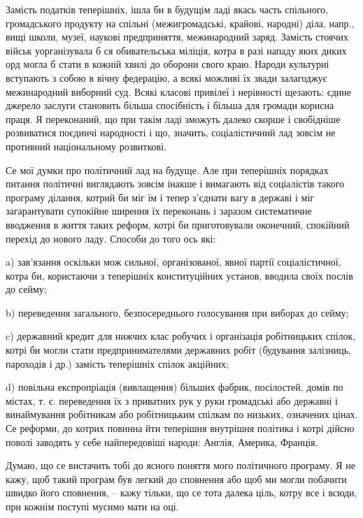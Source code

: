 Замість податків теперішніх, ішла би в будущім ладі якась часть спільного,
громадського продукту на спільні (межигромадські, крайові, народні) діла,
напр., вищі школи, музеї, наукові предприняття, межинародний заряд. Замість
стоячих військ уорганізувала б ся обивательська міліція, котра в разі нападу
яких диких орд могла б стати в кожній хвилі до оборони свого краю. Народи
культурні вступають з собою в вічну федерацію, а всякі можливі їх звади
залагоджує межинародний виборний суд. Всякі класові привілеї і нерівності
щезають: єдине джерело заслуги становить більша спосібність і більша для
громади корисна праця. Я переконаний, що при такім ладі зможуть далеко скорше і
свобідніше розвиватися поєдинчі народності і що, значить, соціалістичний лад
зовсім не противний національному розвиткові.

Се мої думки про політичний лад на будуще. Але при теперішніх порядках питання
політичні виглядають зовсім інакше і вимагають від соціалістів такого програму
ділання, котрий би міг їм і тепер з’єднати вагу в державі і міг загарантувати
супокійне ширення їх переконань і заразом систематичне вводження в життя таких
реформ, котрі би приготовували оконечний, спокійний перехід до нового ладу.
Способи до того ось які:

a) зав’язання оскільки мож сильної, організованої, явної партії соціалістичної, котра би, користаючи з теперішніх конституційних установ, вводила своїх послів до сейму;

b) переведення загального, безпосереднього голосування при виборах до сейму;

c) державний кредит для нижчих клас робучих і організація робітницьких спілок, котрі би могли стати предпринимателями державних робіт (будування залізниць, пароходів і др.) замість теперішніх спілок акційних;

d) повільна експропріація (вивлащення) більших фабрик, посілостей, домів по містах, т. є. переведення їх з приватних рук у руки громадські або державні і винаймування робітникам або робітницьким спілкам по низьких, означених цінах. Се реформи, до котрих повинна йти теперішня внутрішня політика і котрі дійсно поволі заводять у себе найпередовіші народи: Англія, Америка, Франція.

Думаю, що се вистачить тобі до ясного поняття мого політичного програму. Я не кажу, щоб такий програм був легкий до сповнення або щоб ми могли побачити швидко його сповнення, – кажу тільки, що се тота далека ціль, котру все і всюди, при кожнім поступі мусимо мати на оці.

